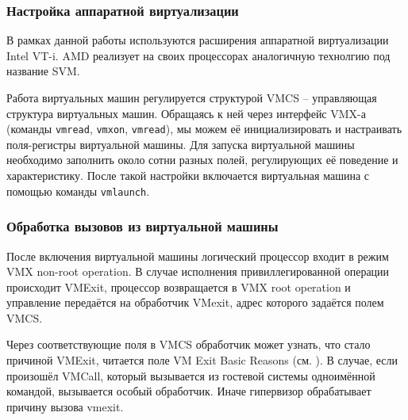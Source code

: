 \documentclass[a4paper,12pt]{extarticle}
\begin{document}
	\subsubsection{Настройка аппаратной виртуализации}
		В рамках данной работы используются расширения аппаратной виртуализации Intel VT-i. AMD реализует на своих процессорах аналогичную технолгию под название SVM.\par
		Работа виртуальных машин регулируется структурой VMCS – управляющая структура виртуальных машин. Обращаясь к ней через интерфейс VMX-а (команды \texttt{vmread}, \texttt{vmxon}, \texttt{vmread}), мы можем её инициализировать и настраивать поля-регистры виртуальной машины. Для запуска виртуальной машины необходимо заполнить около сотни разных полей, регулирующих её поведение и характеристику. После такой настройки включается виртуальная машина с помощью команды \texttt{vmlaunch}.
	\subsubsection{Обработка вызовов из виртуальной машины}
		После включения виртуальной машины логический процессор входит в режим VMX non-root operation. В случае исполнения привиллегированной операции происходит VMExit, процессор возвращается в VMX root operation и управление передаётся на обработчик VMexit, адрес которого задаётся полем VMCS.\par
		Через соответствующие поля в VMCS обработчик может узнать, что стало причиной VMExit, читается поле VM Exit Basic Reasons (см. \cite[том 3D]{intel}). В случае, если произошёл VMCall, который вызывается из гостевой системы одноимённой командой, вызывается особый обработчик. Иначе гипервизор обрабатывает причину вызова vmexit.
\pagebreak
\end{document}
